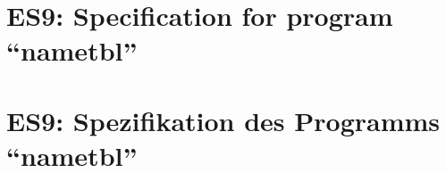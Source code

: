\parindent0pt

\thispagestyle{empty}
\ifenglish
\section*{ES9: Specification for program ``nametbl''}

\fi
\ifgerman
\section*{ES9: Spezifikation des Programms ``nametbl''}

\fi

